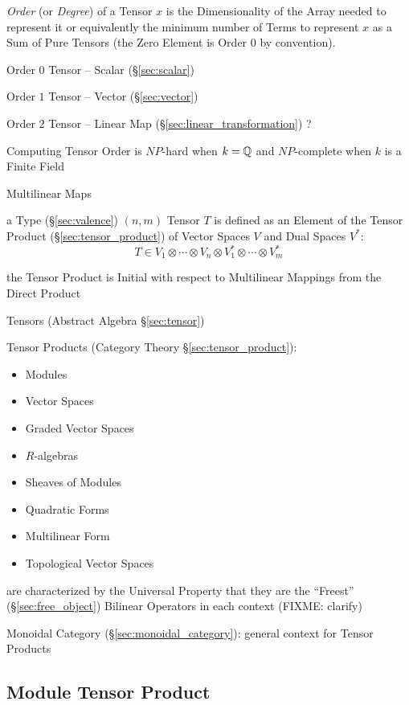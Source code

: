 {\emph{Order} (or \emph{Degree}) of a Tensor $x$ is the
Dimensionality of the Array needed to represent it or equivalently the
minimum number of Terms to represent $x$ as a Sum of Pure Tensors (the
Zero Element is Order $0$ by convention).

Order $0$ Tensor -- Scalar (\S\ref{sec:scalar})

Order $1$ Tensor -- Vector (\S\ref{sec:vector})

Order $2$ Tensor -- Linear Map (\S\ref{sec:linear_transformation}) ?

Computing Tensor Order is $NP$-hard when $k = \mathbb{Q}$ and $NP$-complete
when $k$ is a Finite Field %


\asterism


Multilinear Maps


\asterism


a Type (\S\ref{sec:valence}) $(n,m)$ Tensor $T$ is defined as an
Element of the Tensor Product (\S\ref{sec:tensor_product}) of Vector
Spaces $V$ and Dual Spaces $V^*$:
\[
  T \in V_1 \otimes \cdots \otimes V_n
    \otimes V^*_1 \otimes \cdots \otimes V^*_m
\]

the Tensor Product is Initial with respect to Multilinear Mappings
from the Direct Product

Tensors (Abstract Algebra \S\ref{sec:tensor})

Tensor Products (Category Theory \S\ref{sec:tensor_product}):
\begin{itemize}
  \item Modules
  \item Vector Spaces
  \item Graded Vector Spaces
  \item $R$-algebras
  \item Sheaves of Modules
  \item Quadratic Forms
  \item Multilinear Form
  \item Topological Vector Spaces
\end{itemize}
are characterized by the Universal Property that they are the ``Freest''
(\S\ref{sec:free_object}) Bilinear Operators in each context
(FIXME: clarify)

Monoidal Category (\S\ref{sec:monoidal_category}): general context for
Tensor Products



\subsection{Module Tensor Product}\label{sec:module_tensor_product}

}
